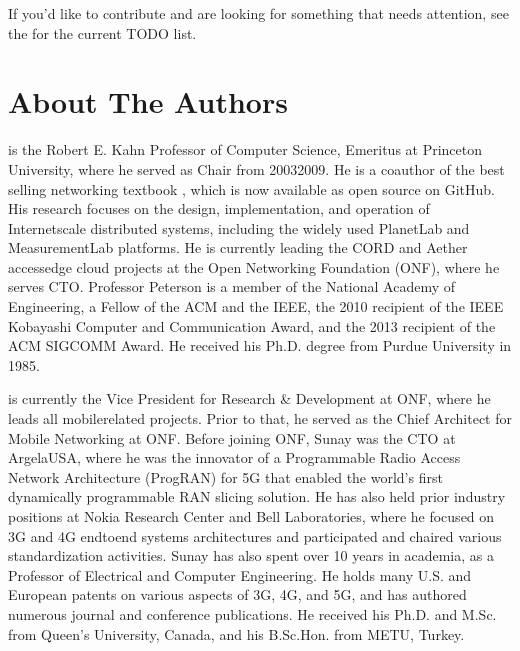 \documentclass[a4paper,11pt,english]{sphinxmanual}
\begin{document}
\sphinxAtStartPar
If you’d like to contribute and are looking for something that needs
attention, see the 
for the current TODO list.


\chapter{About The Authors}
\label{\detokenize{authors:about-the-authors}}\label{\detokenize{authors::doc}}
\sphinxAtStartPar
{} is the Robert E. Kahn Professor of Computer
Science, Emeritus at Princeton University, where he served as Chair
from 2003\sphinxhyphen{}2009. He is a co\sphinxhyphen{}author of the best selling networking
textbook , which is now
available as open source on GitHub. His research focuses on the
design, implementation, and operation of Internet\sphinxhyphen{}scale distributed
systems, including the widely used PlanetLab and MeasurementLab
platforms.  He is currently leading the CORD and Aether access\sphinxhyphen{}edge
cloud projects at the Open Networking Foundation (ONF), where he
serves CTO.  Professor Peterson is a member of the National Academy of
Engineering, a Fellow of the ACM and the IEEE, the 2010 recipient of
the IEEE Kobayashi Computer and Communication Award, and the 2013
recipient of the ACM SIGCOMM Award. He received his Ph.D. degree from
Purdue University in 1985.

\sphinxAtStartPar
{} is currently the Vice President for Research \&
Development at ONF, where he leads all mobile\sphinxhyphen{}related projects. Prior
to that, he served as the Chief Architect for Mobile Networking at
ONF. Before joining ONF, Sunay was the CTO at Argela\sphinxhyphen{}USA, where he was
the innovator of a Programmable Radio Access Network Architecture
(ProgRAN) for 5G that enabled the world’s first dynamically
programmable RAN slicing solution. He has also held prior industry
positions at Nokia Research Center and Bell Laboratories, where he
focused on 3G and 4G end\sphinxhyphen{}to\sphinxhyphen{}end systems architectures and participated
and chaired various standardization activities. Sunay has also spent
over 10 years in academia, as a Professor of Electrical and Computer
Engineering. He holds many U.S. and European patents on various
aspects of 3G, 4G, and 5G, and has authored numerous journal and
conference publications. He received his Ph.D. and M.Sc. from Queen’s
University, Canada, and his B.Sc.Hon. from METU, Turkey.
\end{document}

